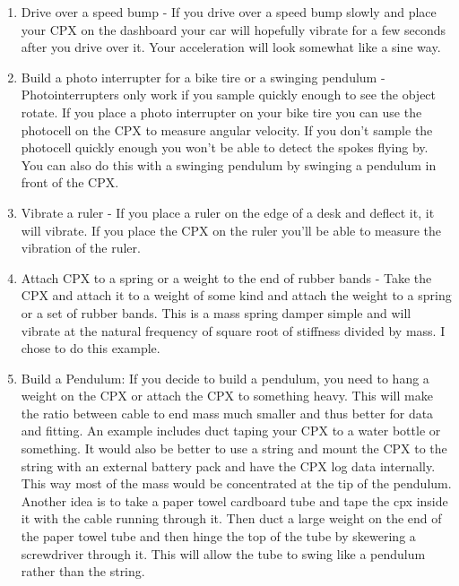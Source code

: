 \begin{enumerate}[itemsep=-5pt]
\item Drive over a speed bump - If you drive over a speed bump slowly and place your CPX on the dashboard your car will hopefully vibrate for a few seconds after you drive over it. Your acceleration will look somewhat like a sine way.
\item Build a photo interrupter for a bike tire or a swinging pendulum - Photointerrupters only work if you sample quickly enough to see the object rotate. If you place a photo interrupter on your bike tire you can use the photocell on the CPX to measure angular velocity. If you don’t sample the photocell quickly enough you won’t be able to detect the spokes flying by. You can also do this with a swinging pendulum by swinging a pendulum in front of the CPX.
\item Vibrate a ruler - If you place a ruler on the edge of a desk and deflect it, it will vibrate. If you place the CPX on the ruler you’ll be able to measure the vibration of the ruler.
\item Attach CPX to a spring or a weight to the end of rubber bands - Take the CPX and attach it to a weight of some kind and attach the weight to a spring or a set of rubber bands. This is a mass spring damper simple and will vibrate at the natural frequency of square root of stiffness divided by mass. I chose to do this example.
\item Build a Pendulum: If you decide to build a pendulum, you need to hang a weight on the CPX or attach the CPX to something heavy. This will make the ratio between cable to end mass much smaller and thus better for data and fitting. An example includes  duct taping your CPX to a water bottle or something. It would also be better to use a string and mount the CPX to the string with an external battery pack and have the CPX log data internally. This way most of the mass would be concentrated at the tip of the pendulum. Another idea is to take a paper towel cardboard tube and tape the cpx inside it with the cable running through it. Then duct a large weight on the end of the paper towel tube and then hinge the top of the tube by skewering a screwdriver through it. This will allow the tube to swing like a pendulum rather than the string. 
\end{enumerate}

